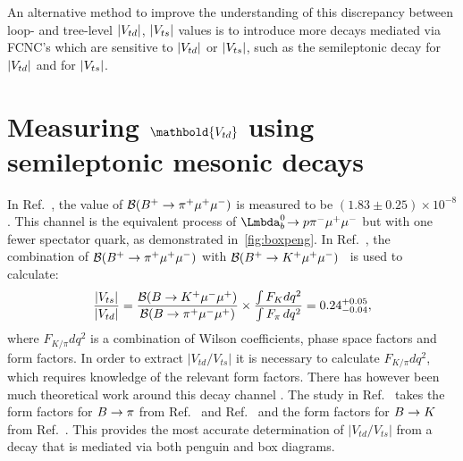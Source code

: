 An alternative method to improve the understanding of this discrepancy between loop- and tree-level $|{V_{{t}{d}}}|$, $|{V_{{t}{s}}}|$ values is to introduce more decays mediated via FCNC's which are sensitive to $|{V_{{t}{d}}}|$ or $|{V_{{t}{s}}}|$, such as the semileptonic decay \Lbpi for $|{V_{{t}{d}}}|$ and \LbK for $|{V_{{t}{s}}}|$.

\section[Measuring \Vtd using semileptonic mesonic decays]{Measuring $\mathbold{\Vtd}$ using semileptonic mesonic decays}
\label{sec:bpipi}
In Ref.~\cite{pimumunew}, the value of ${\cal B}({{B}^+}\rightarrow{\ensuremath{{\pi}^+}}{\ensuremath{\mu^+\mu^-}})$ is measured to be $(1.83\pm0.25) \times 10^{-8}$. This channel is the equivalent process of $\Lbpi$ but with one fewer spectator quark, as demonstrated in~\autoref{fig:boxpeng}. In Ref.~\cite{pimumunew}, the combination of ${\cal B}({{B}^+}\rightarrow{\ensuremath{{\pi}^+}}{\ensuremath{\mu^+\mu^-}})$ with ${\cal B}({{B}^+}\rightarrow{\ensuremath{{K}^+}}{\ensuremath{\mu^+\mu^-}})$~\cite{bKmumu} is used to calculate: %
\begin{equation}
  \frac{|V_{ts}|}{|V_{td}|} = \frac{{\cal B}({B}\rightarrow{\ensuremath{{K}^+}}{\ensuremath{\mu^-}}{\ensuremath{\mu^+}})}{{\cal B}({B}\rightarrow{\ensuremath{{\pi}^+}}{\ensuremath{\mu^-}}{\ensuremath{\mu^+}})} \times \frac{\int F_{K}d q^{2}}{\int F_{\pi}\,dq^{2}} = 0.24^{+0.05}_{-0.04},
  \end{equation}
where $F_{K/\pi}d q^{2}$ is a combination of Wilson coefficients, phase space factors and form factors. In order to extract $|V_{td}/V_{ts}|$ it is necessary to calculate $F_{K/\pi}d q^{2}$, which requires knowledge of the relevant form factors.  There has however been much theoretical work around this decay channel \cite{bpipi_th_1,bpipi_th_2,bpipi_th_3,bpipi_th_4, bpimumuff1, bpimumuff2}. The study in Ref.~\cite{pimumunew} takes the form factors for ${B}\rightarrow\pi$ from Ref.~\cite{bpimumuff1} and Ref.~\cite{bpimumuff2} and the form factors for ${B}\rightarrow K$ from Ref.~\cite{bKmumuff1}. This provides the most accurate determination of $|V_{td}/V_{ts}|$ from a decay that is mediated via both penguin and box diagrams.%

